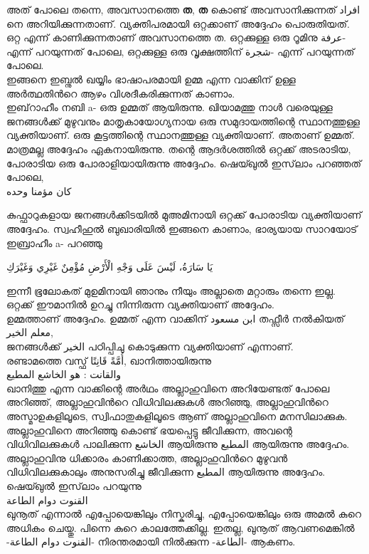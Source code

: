   അത് പോലെ തന്നെ, അവസാനത്തെ \textbf{ത}, \textbf{ത} കൊണ്ട് അവസാനിക്കുന്നത് \textarabic{افراد} നെ അറിയിക്കുന്നതാണ്. വ്യക്തിപരമായി ഒറ്റക്കാണ് അദ്ദേഹം പൊരുതിയത്. ഒറ്റ എന്ന് കാണിക്കുന്നതാണ് അവസാനത്തെ ത. ഒറ്റക്കുള്ള ഒരു റൂമിനു \textarabic{عرفة}- എന്ന് പറയുന്നത് പോലെ, ഒറ്റക്കുള്ള ഒരു വൃക്ഷത്തിന് \textarabic{شجرة}- എന്ന് പറയുന്നത് പോലെ. \\
     ഇങ്ങനെ ഇബ്നുൽ ഖയ്യിം ഭാഷാപരമായി ഉമ്മ എന്ന വാക്കിന് ഉള്ള അർത്ഥതിൻറെ ആഴം വിശദീകരിക്കുന്നത് കാണാം.\\
   
   
    ഇബ്‌റാഹീം നബി a- ഒരു ഉമ്മത് ആയിരുന്നു. ഖിയാമത്തു നാൾ വരെയുള്ള ജനങ്ങൾക്ക് മുഴുവനും  മാതൃകായോഗ്യനായ ഒരു സമുദായത്തിന്റെ സ്ഥാനത്തുള്ള വ്യക്തിയാണ്. ഒരു കൂട്ടത്തിന്റെ  സ്ഥാനത്തുള്ള വ്യക്തിയാണ്. അതാണ് ഉമ്മത്. \\
      
     
 മാത്രമല്ല അദ്ദേഹം ഏകനായിരുന്നു.  തന്റെ ആദർശത്തിൽ ഒറ്റക്ക് അടരാടിയ, പോരാടിയ ഒരു പോരാളിയായിരുന്നു അദ്ദേഹം. ഷെയ്ഖുൽ ഇസ്‌ലാം പറഞ്ഞത് പോലെ, \\
 \textarabic{كان مؤمنا وحده} 

കുഫ്ഫാറുകളായ ജനങ്ങൾക്കിടയിൽ മുഅമിനായി ഒറ്റക്ക് പോരാടിയ വ്യക്തിയാണ് അദ്ദേഹം. സ്വഹീഹുൽ ബുഖാരിയിൽ ഇങ്ങനെ കാണാം, ഭാര്യയായ സാറയോട് ഇബ്രാഹീം a- പറഞ്ഞു  

\textarabic{يَا سَارَةُ، لَيْسَ عَلَى وَجْهِ الْأَرْضِ مُؤْمِنٌ غَيْرِي وَغَيْرَكِ}

ഇന്നീ ഭൂലോകത് മുഉമിനായി ഞാനും നീയും അല്ലാതെ മറ്റാരും തന്നെ ഇല്ല. ഒറ്റക്ക് ഈമാനിൽ ഉറച്ചു നിന്നിരുന്ന വ്യക്തിയാണ് അദ്ദേഹം. \\

ഉമ്മത്താണ് അദ്ദേഹം. ഉമ്മത് എന്ന വാക്കിന് \textarabic{ابن مسعود} തഫ്സീർ നൽകിയത് \textarabic{معلم الخير}, \\
  ജനങ്ങൾക്ക് \textarabic{ الخير} പഠിപ്പിചു കൊടുക്കുന്ന വ്യക്തിയാണ് എന്നാണ്. \\
  
  

രണ്ടാമത്തെ വസ്ഫ് \textarabic{ أُمَّةً قَانِتًا},  ഖാനിത്തായിരുന്നു  \\
 \textarabic{والقانت : هو الخاشع المطيع} \\
 ഖാനിത്തു എന്ന വാക്കിന്റെ അർഥം അല്ലാഹുവിനെ അറിയേണ്ടത് പോലെ അറിഞ്ഞ്, അല്ലാഹുവിൻറെ വിധിവിലക്കുകൾ അറിഞ്ഞു, അല്ലാഹുവിൻറെ അസ്മാഉകളിലൂടെ, സ്വിഫാതുകളിലൂടെ ആണ്  അല്ലാഹുവിനെ മനസിലാക്കുക. അല്ലാഹുവിനെ അറിഞ്ഞു കൊണ്ട് ഭയപ്പെട്ടു ജീവിക്കുന്ന, അവന്റെ വിധിവിലക്കുകൾ പാലിക്കുന്ന \textarabic{الخاشع} ആയിരുന്നു \textarabic{المطيع} ആയിരുന്നു അദ്ദേഹം.\\
 
   അല്ലാഹുവിനു ധിക്കാരം കാണിക്കാത്ത, അല്ലാഹുവിൻറെ മുഴുവൻ വിധിവിലക്കുകാലും അനുസരിച്ചു ജീവിക്കുന്ന  \textarabic{المطيع} ആയിരുന്നു അദ്ദേഹം. \\
     ഷെയ്ഖുൽ ഇസ്‌ലാം പറയുന്നു \\ \textarabic{القنوت دوام الطاعة} \\ 
     ഖുനൂത് എന്നാൽ 
     എപ്പോയെങ്കിലും നിസ്കരിച്ചു,  എപ്പോയെങ്കിലും ഒരു അമൽ കുറെ അധികം ചെയ്തു. പിന്നെ കുറെ കാലത്തേക്കില്ല. ഇതല്ല, ഖുനൂത് ആവണമെങ്കിൽ -\textarabic{القنوت دوام الطاعة}- നിരന്തരമായി നിൽക്കുന്ന -\textarabic{الطاعة}- ആകണം. 
     
